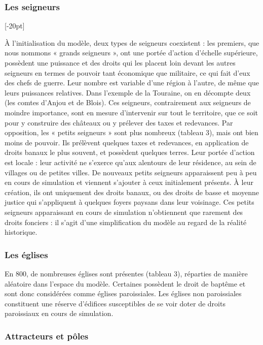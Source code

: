 \subsubsection{Les seigneurs}[-20pt]

À l'initialisation du modèle, deux types de seigneurs coexistent : les premiers, que nous nommons « grands seigneurs », ont une portée d'action d'échelle supérieure, possèdent une puissance et des droits qui les placent loin devant les autres seigneurs en termes de pouvoir tant économique que militaire, ce qui fait d'eux des chefs de guerre.
Leur nombre est variable d'une région à l'autre, de même que leurs puissances relatives.
Dans l'exemple de la Touraine, on en décompte deux (les comtes d'Anjou et de Blois).
Ces seigneurs, contrairement aux seigneurs de moindre importance, sont en mesure d'intervenir sur tout le territoire, que ce soit pour y construire des châteaux ou y prélever des taxes et redevances.
Par opposition, les « petits seigneurs » sont plus nombreux (tableau 3), mais ont bien moins de pouvoir.
Ils prélèvent quelques taxes et redevances, en application de droits banaux le plus souvent, et possèdent quelques terres.
Leur portée d'action est locale : leur activité ne s'exerce qu'aux alentours de leur résidence, au sein de villages ou de petites villes.
De nouveaux petits seigneurs apparaissent peu à peu en cours de simulation et viennent s'ajouter à ceux initialement présents.
À leur création, ils ont uniquement des droits banaux, ou des droits de basse et moyenne justice qui s'appliquent à quelques foyers paysans dans leur voisinage.
Ces petits seigneurs apparaissant en cours de simulation n'obtiennent que rarement des droits fonciers : il s'agit d'une simplification du modèle au regard de la réalité historique.

\subsubsection{Les églises}

En 800, de nombreuses églises sont présentes (tableau 3), réparties de manière aléatoire dans l'espace du modèle. 
Certaines possèdent le droit de baptême et sont donc considérées comme églises paroissiales.
Les églises non paroissiales constituent une réserve d'édifices susceptibles de se voir doter de droits paroissiaux en cours de simulation.

\subsubsection{Attracteurs et pôles}

